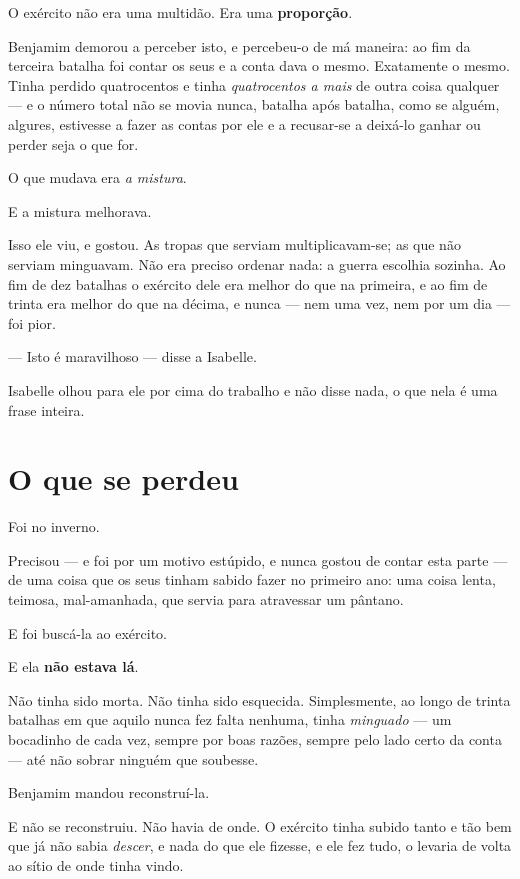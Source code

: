\documentclass[livro.tex]{subfiles}
\begin{document}
O exército não era uma multidão. Era uma \textbf{proporção}.

Benjamim demorou a perceber isto, e percebeu-o de má maneira: ao fim da terceira batalha foi contar os seus e a
conta dava o mesmo. Exatamente o mesmo. Tinha perdido quatrocentos e tinha \emph{quatrocentos a mais} de outra
coisa qualquer --- e o número total não se movia nunca, batalha após batalha, como se alguém, algures, estivesse a
fazer as contas por ele e a recusar-se a deixá-lo ganhar ou perder seja o que for.

O que mudava era \emph{a mistura}.

\medskip

E a mistura melhorava.

Isso ele viu, e gostou. As tropas que serviam multiplicavam-se; as que não serviam minguavam. Não era preciso
ordenar nada: a guerra escolhia sozinha. Ao fim de dez batalhas o exército dele era melhor do que na primeira, e ao
fim de trinta era melhor do que na décima, e nunca --- nem uma vez, nem por um dia --- foi pior.

--- Isto é maravilhoso --- disse a Isabelle.

Isabelle olhou para ele por cima do trabalho e não disse nada, o que nela é uma frase inteira.

\section*{O que se perdeu}

Foi no inverno.

Precisou --- e foi por um motivo estúpido, e nunca gostou de contar esta parte --- de uma coisa que os seus tinham
sabido fazer no primeiro ano: uma coisa lenta, teimosa, mal-amanhada, que servia para atravessar um pântano.

E foi buscá-la ao exército.

E ela \textbf{não estava lá}.

\medskip

Não tinha sido morta. Não tinha sido esquecida. Simplesmente, ao longo de trinta batalhas em que aquilo nunca fez
falta nenhuma, tinha \emph{minguado} --- um bocadinho de cada vez, sempre por boas razões, sempre pelo lado certo
da conta --- até não sobrar ninguém que soubesse.

Benjamim mandou reconstruí-la.

E não se reconstruiu. Não havia de onde. O exército tinha subido tanto e tão bem que já não sabia \emph{descer}, e
nada do que ele fizesse, e ele fez tudo, o levaria de volta ao sítio de onde tinha vindo.
\end{document}
